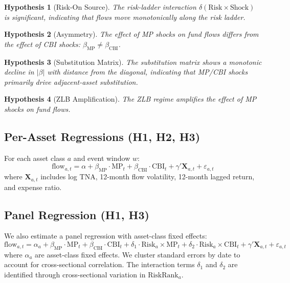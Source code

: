 \documentclass[11pt,a4paper]{article}
\newtheorem{hypothesis}{Hypothesis}
\begin{document}
\begin{hypothesis}[Risk-On Source]
\label{hyp:h2}
The risk-ladder interaction $\delta(\text{Risk}\times\text{Shock})$ is significant, indicating that flows move monotonically along the risk ladder.
\end{hypothesis}

\begin{hypothesis}[Asymmetry]
\label{hyp:h3}
The effect of MP shocks on fund flows differs from the effect of CBI shocks: $\beta_{\text{MP}} \neq \beta_{\text{CBI}}$.
\end{hypothesis}

\begin{hypothesis}[Substitution Matrix]
\label{hyp:h4}
The substitution matrix shows a monotonic decline in $|\beta|$ with distance from the diagonal, indicating that MP/CBI shocks primarily drive adjacent-asset substitution.
\end{hypothesis}

\begin{hypothesis}[ZLB Amplification]
\label{hyp:h5}
The ZLB regime amplifies the effect of MP shocks on fund flows.
\end{hypothesis}

\subsection{Per-Asset Regressions (H1, H2, H3)}

For each asset class $a$ and event window $w$:
\begin{equation}
\text{flow}_{a,t} = \alpha + \beta_{\text{MP}} \cdot \text{MP}_t + \beta_{\text{CBI}} \cdot \text{CBI}_t + \gamma' \mathbf{X}_{a,t} + \varepsilon_{a,t}
\end{equation}
where $\mathbf{X}_{a,t}$ includes log TNA, 12-month flow volatility, 12-month lagged return, and expense ratio.

\subsection{Panel Regression (H1, H3)}

We also estimate a panel regression with asset-class fixed effects:
\begin{equation}
\text{flow}_{a,t} = \alpha_a + \beta_{\text{MP}} \cdot \text{MP}_t + \beta_{\text{CBI}} \cdot \text{CBI}_t + \delta_1 \cdot \text{Risk}_a \times \text{MP}_t + \delta_2 \cdot \text{Risk}_a \times \text{CBI}_t + \gamma' \mathbf{X}_{a,t} + \varepsilon_{a,t}
\end{equation}
where $\alpha_a$ are asset-class fixed effects. We cluster standard errors by date to account for cross-sectional correlation. The interaction terms $\delta_1$ and $\delta_2$ are identified through cross-sectional variation in $\text{RiskRank}_a$.
\end{document}
